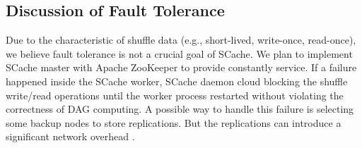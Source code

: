 
\subsection{Discussion of Fault Tolerance}

\ifrevision
\reversemarginpar
{}
\fi
Due to the characteristic of shuffle data (e.g., short-lived, write-once, read-once), we believe fault tolerance is not a crucial goal of SCache. 
We plan to implement SCache master with Apache ZooKeeper \cite{zookeeper} to provide constantly service. 
If a failure happened inside the SCache worker, SCache daemon cloud blocking the shuffle write/read operations until the worker process restarted without violating the correctness of DAG computing.
A possible way to handle this failure is selecting some backup nodes to store replications. 
But the replications can introduce a significant network overhead \cite{availability}.  



